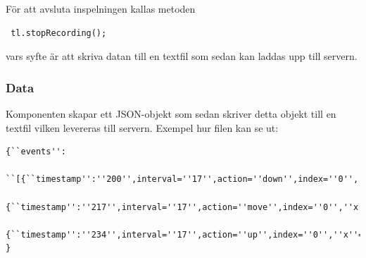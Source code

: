  För att avsluta inspelningen kallas metoden
 \begin{verbatim}
 tl.stopRecording();
 \end{verbatim}
 vars syfte är att skriva datan till en textfil som sedan kan laddas upp till servern.
\subsubsection{Data}
Komponenten skapar ett JSON-objekt som sedan skriver detta objekt till en textfil vilken levereras till servern. Exempel hur filen kan se ut:
\begin{verbatim}
{``events'':
	``[{``timestamp'':''200'',interval=''17'',action=''down'',index=''0'',''x''=''310'',y=''670''},
	     {``timestamp'':''217'',interval=''17'',action=''move'',index=''0'',''x''=''320'',y=''680''},
	     {``timestamp'':''234'',interval=''17'',action=''up'',index=''0'',''x''=''330'',y=''700''}]''
}
\end{verbatim}